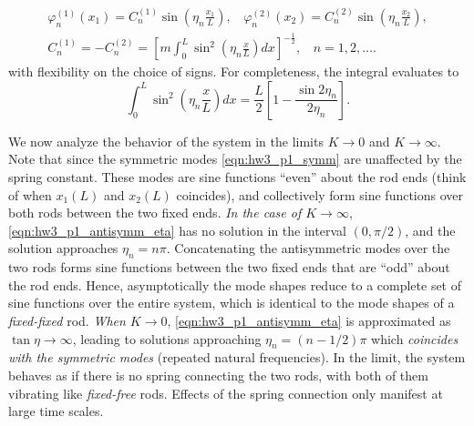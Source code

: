 \begin{enumerate}[(1)]
{\begin{equation}
\begin{gathered}
        \varphi_n^{(1)}(x_1) = C_n^{(1)} \sin \left(\eta_n \frac{x_1}{L} \right), ~~~~
        \varphi_n^{(2)}(x_2) = C_n^{(2)} \sin \left(\eta_n \frac{x_2}{L} \right), \\
        C_n^{(1)} = -C_n^{(2)} = {\left[m \int_0^L \sin^2\left(\eta_n \frac{x}{L}\right) dx\right]}^{-\frac{1}{2}}, ~~~~ n = 1, 2, \ldots.
    \end{gathered}
    \end{equation}
    with flexibility on the choice of signs. 
    For completeness, the integral evaluates to 
    \begin{equation}
        \int_0^L \sin^2\left(\eta_n \frac{x}{L}\right) dx = \frac{L}{2}\left[1 - \frac{\sin 2\eta_n}{2\eta_n} \right].
    \end{equation}
}
\end{enumerate}

We now analyze the behavior of the system in the limits $K \rightarrow 0$ and $K \rightarrow \infty$.
Note that since the symmetric modes \cref{eqn:hw3_p1_symm} are unaffected by the spring constant. 
These modes are sine functions ``even'' about the rod ends (think of when $x_1(L)$ and $x_2(L)$ coincides), and collectively form sine functions over both rods between the two fixed ends. 
\emph{In the case of $K \rightarrow \infty$}, \cref{eqn:hw3_p1_antisymm_eta} has no solution in the interval $(0, \pi/2)$, and the solution approaches $\eta_n = n\pi$. 
Concatenating the antisymmetric modes over the two rods forms sine functions between the two fixed ends that are ``odd'' about the rod ends.
Hence, asymptotically the mode shapes reduce to a complete set of sine functions over the entire system, which is identical to the mode shapes of a \emph{fixed-fixed} rod. 
\emph{When $K \rightarrow 0$}, \cref{eqn:hw3_p1_antisymm_eta} is approximated as $\tan\eta \rightarrow\infty$, leading to solutions approaching $\eta_n = (n - 1/2)\pi$ which \emph{coincides with the symmetric modes} (repeated natural frequencies). 
In the limit, the system behaves as if there is no spring connecting the two rods, with both of them vibrating like \emph{fixed-free} rods. 
Effects of the spring connection only manifest at large time scales.

